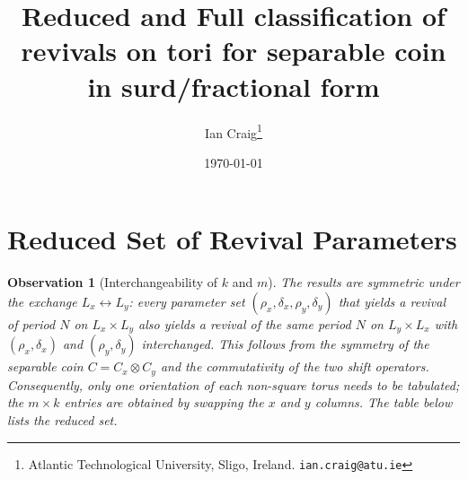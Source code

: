 \documentclass{article}
\title{Reduced and Full classification of revivals on tori for separable coin in surd/fractional form}
\author{Ian Craig\thanks{Atlantic Technological University, Sligo, Ireland. \texttt{ian.craig@atu.ie}}}
\date{\today}
\newtheorem{observation}{Observation}
\begin{document}
\maketitle



\section{Reduced Set of Revival Parameters}

\begin{observation}[Interchangeability of $k$ and $m$]
The results are symmetric under the exchange $L_x \leftrightarrow L_y$:
every parameter set $(\rho_x,\delta_x,\rho_y,\delta_y)$ that yields a
revival of period $N$ on $L_x \times L_y$ also yields a revival of the same
period $N$ on $L_y \times L_x$ with $(\rho_x,\delta_x)$ and
$(\rho_y,\delta_y)$ interchanged. This follows from the symmetry of the
separable coin $C = C_x \otimes C_y$ and the commutativity of the two shift
operators. Consequently, only one orientation of each non-square torus
needs to be tabulated; the $m \times k$ entries are obtained by swapping
the $x$ and $y$ columns. The table below lists the reduced set.
\end{observation}
\end{document}
